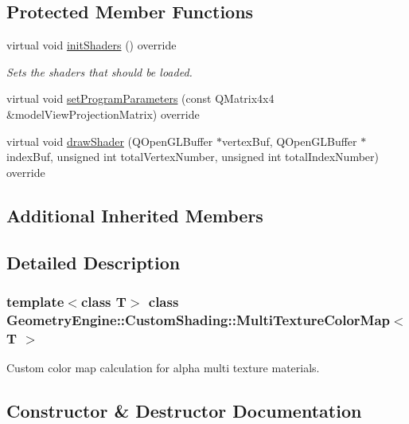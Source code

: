 \subsection*{Protected Member Functions}
\begin{DoxyCompactItemize}
\item 
\mbox{\label{class_geometry_engine_1_1_custom_shading_1_1_multi_texture_color_map_aa3bd9c8acf84ffd8a742c9c8b20e600a}} 
virtual void \mbox{\hyperlink{class_geometry_engine_1_1_custom_shading_1_1_multi_texture_color_map_aa3bd9c8acf84ffd8a742c9c8b20e600a}{init\+Shaders}} () override
\begin{DoxyCompactList}\small\item\em Sets the shaders that should be loaded. \end{DoxyCompactList}\item 
virtual void \mbox{\hyperlink{class_geometry_engine_1_1_custom_shading_1_1_multi_texture_color_map_a5cee1ebee9e647db140bc4a5d0dfdaa6}{set\+Program\+Parameters}} (const Q\+Matrix4x4 \&model\+View\+Projection\+Matrix) override
\item 
virtual void \mbox{\hyperlink{class_geometry_engine_1_1_custom_shading_1_1_multi_texture_color_map_a501944cf2165e0f11d20cb84c25a417b}{draw\+Shader}} (Q\+Open\+G\+L\+Buffer $\ast$vertex\+Buf, Q\+Open\+G\+L\+Buffer $\ast$index\+Buf, unsigned int total\+Vertex\+Number, unsigned int total\+Index\+Number) override
\end{DoxyCompactItemize}
\subsection*{Additional Inherited Members}


\subsection{Detailed Description}
\subsubsection*{template$<$class T$>$\newline
class Geometry\+Engine\+::\+Custom\+Shading\+::\+Multi\+Texture\+Color\+Map$<$ T $>$}

Custom color map calculation for alpha multi texture materials. 

\subsection{Constructor \& Destructor Documentation}
\mbox{\label{class_geometry_engine_1_1_custom_shading_1_1_multi_texture_color_map_a3865507428ef4499c957b71ce011ed3e}} 

